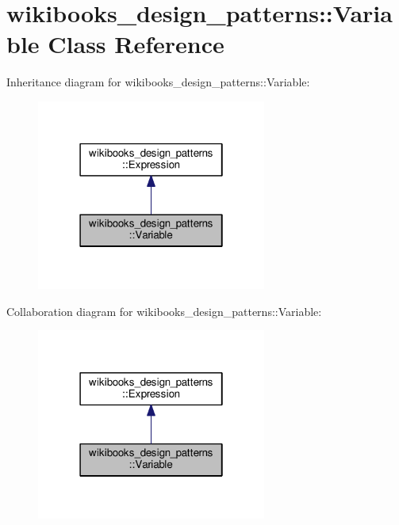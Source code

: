 \hypertarget{classwikibooks__design__patterns_1_1Variable}{}\section{wikibooks\+\_\+design\+\_\+patterns\+:\+:Variable Class Reference}
\label{classwikibooks__design__patterns_1_1Variable}


Inheritance diagram for wikibooks\+\_\+design\+\_\+patterns\+:\+:Variable\+:
\nopagebreak
\begin{figure}[H]
\begin{center}
\leavevmode
\includegraphics[width=214pt]{classwikibooks__design__patterns_1_1Variable__inherit__graph}
\end{center}
\end{figure}


Collaboration diagram for wikibooks\+\_\+design\+\_\+patterns\+:\+:Variable\+:
\nopagebreak
\begin{figure}[H]
\begin{center}
\leavevmode
\includegraphics[width=214pt]{classwikibooks__design__patterns_1_1Variable__coll__graph}
\end{center}
\end{figure}
